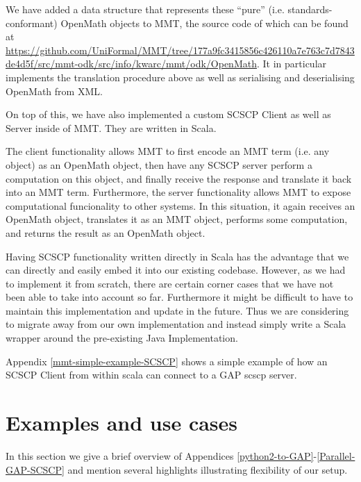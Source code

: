\documentclass{deliverablereport}
\begin{document}
We have added a data structure that represents these ``pure''
(i.e. standards-conformant) OpenMath objects to MMT, the source code of
which can be found at
\url{https://github.com/UniFormal/MMT/tree/177a9fc3415856c426110a7e763c7d7843de4d5f/src/mmt-odk/src/info/kwarc/mmt/odk/OpenMath}.
It in particular implements the translation procedure above as well as
serialising and deserialising OpenMath from XML.

On top of this, we have also implemented a custom SCSCP Client as well as Server inside of MMT.
They are written in Scala.

The client functionality allows MMT to first encode an MMT term
(i.e. any object) as an OpenMath object, then have any SCSCP server
perform a computation on this object, and finally receive the response
and translate it back into an MMT term.  Furthermore, the server
functionality allows MMT to expose computational funcionality to other
systems.  In this situation, it again receives an OpenMath object,
translates it as an MMT object, performs some computation, and returns
the result as an OpenMath object.

Having SCSCP functionality written directly in Scala has the advantage
that we can directly and easily embed it into our existing codebase.
However, as we had to implement it from scratch, there are certain
corner cases that we have not been able to take into account so far.
Furthermore it might be difficult to have to maintain this
implementation and update in the future.  Thus we are considering to
migrate away from our own implementation and instead simply write a
Scala wrapper around the pre-existing Java Implementation.


Appendix \ref{mmt-simple-example-SCSCP} shows a simple example of how an SCSCP Client from within scala can connect to a GAP scscp server.  

\section{Examples and use cases}\label{examples}

In this section we give a brief overview of 
Appendices \ref{python2-to-GAP}-\ref{Parallel-GAP-SCSCP}
and mention several highlights illustrating flexibility of our setup.
\end{document}
